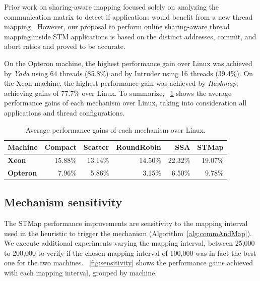 Prior work on sharing-aware mapping focused solely on analyzing the communication matrix to detect if applications would benefit from a new thread mapping \cite{Diener2015,Bordage:2018}. However, our proposal to perform online sharing-aware thread mapping  inside STM applications is based on the distinct addresses, commit, and abort ratios and proved to be accurate.

On the Opteron machine, the highest performance gain over Linux was achieved by \emph{Yada} using 64 threads (85.8\%) and by Intruder using 16 threads (39.4\%). On the Xeon machine, the highest performance gain was achieved by \emph{Hashmap}, achieving gains of 77.7\% over Linux. %
To summarize, \tablename~\ref{tab:resultsOnline} shows the average performance gains of each mechanism over Linux, taking into consideration all applications and thread configurations.
\begin{table}[tb]
	\centering
	\caption{Average performance gains of each mechanism over Linux.}
	\label{tab:resultsOnline}
	\begin{tabular}{lrrrrr}
		\toprule
		\textbf{Machine}  & \textbf{Compact} & \textbf{Scatter} & \textbf{Round\textbf{}Robin} & \textbf{SSA} &  \textbf{STMap} \\
		\midrule
		\textbf{Xeon}   & 15.88\%          & 13.14\%          & 14.50\%            & 22.32\%   &  19.07\%        \\
		\textbf{Opteron} & 7.96\%           & 5.86\%           & 3.15\%            & 6.50\%     & 9.78\%       \\
		\bottomrule
	\end{tabular}
\end{table}

\subsection{Mechanism sensitivity}\label{sec:sensitivity}

The STMap performance improvements are sensitivity to the mapping interval used in the heuristic to trigger the mechanism (Algorithm~\ref{alg:commAndMap}). We execute additional experiments varying the mapping interval, between 25,000 to 200,000 to verify if the chosen mapping interval of 100,000 was in fact the best one for the two machines. \figurename~\ref{fig:sensitivity} shows the performance gains achieved with each mapping interval, grouped by machine.

